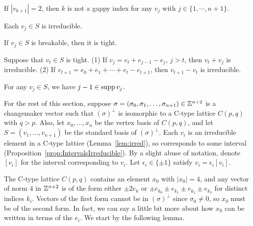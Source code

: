 \begin{lemma} \label{gappy3}
If $|v_{k+1}|=2$, then $k$ is not a gappy index for any $v_j$ with $j \in \{1, \cdots, n+1 \}$.
\end{lemma}

\begin{lemma} \label{lem:irred}
Each $v_j \in S$ is irreducible.
\end{lemma}

\begin{lemma}\label{lem:BrIsTight}
If $v_j \in S$ is breakable, then it is tight.
\end{lemma}

\begin{lemma}\label{lem:SumIrr}
Suppose that $v_t \in S$ is tight.
\newline(1) If $v_j = e_t + e_{j-1} - e_j$, $j > t$, then $v_t + v_j$ is irreducible.
\newline(2) If $v_{t+1}=e_0+e_1+\cdots+e_t-e_{t+1}$, then $v_{t+1}- v_t$ is irreducible.
\end{lemma}


\begin{lemma}\label{lem:j-1}
For any $v_j\in S$, we have $j-1\in\operatorname{supp} v_j$.
\end{lemma}





For the rest of this section, suppose $\sigma = (\sigma_0,\sigma_1,\dots,\sigma_{n+1}) \in \mathbb{Z}^{n+2}$ is a changemaker vector such that $(\sigma)^\perp$ is isomorphic to a C-type lattice $C(p,q)$ with $q > p$. Also, let $x_0,\dots,x_n$ be the vertex basis of $C(p,q)$, and let $S = (v_1,\dots,v_{n+1})$ be the standard basis of $(\sigma)^\perp$. Each $v_i$ is an irreducible element in a C-type lattice (Lemma~\ref{lem:irred}), so corresponds to some interval (Proposition~\ref{prop:IntervalsIrreducible}). By a slight abuse of notation, denote $[v_i]$ for the interval corresponding to $v_i$. Let $\epsilon_i\in\{\pm1\}$ satisfy $v_i = \epsilon_i [v_i]$. 

The C-type lattice $C(p,q)$ contains an element $x_0$ with $|x_0| = 4$, and any vector of norm $4$ in $\mathbb{Z}^{n+2}$ is of the form either $ \pm 2e_k$ or $\pm e_{k_0}\pm e_{k_1}\pm e_{k_2}\pm e_{k_3}$ for distinct indices $k_i$. Vectors of the first form cannot be in $(\sigma)^\perp$ since $\sigma_0 \neq 0$, so $x_0$ must be of the second form. In fact, we can say a little bit more about how $x_0$ can be written in terms of the $e_i$. We start by the following lemma.

